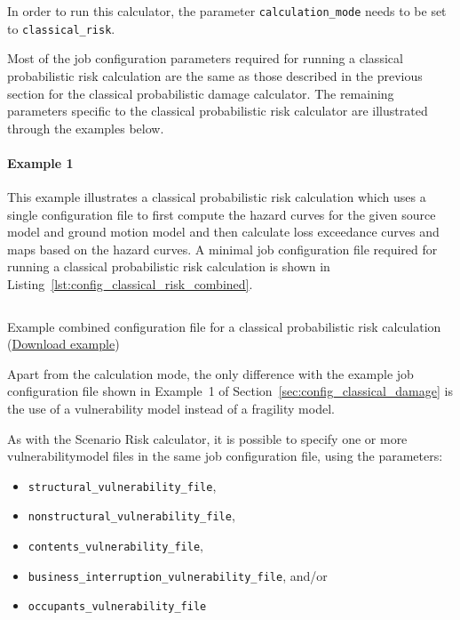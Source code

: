 In order to run this calculator, the parameter \Verb+calculation_mode+ needs
to be set to \Verb+classical_risk+.

Most of the job configuration parameters required for running a classical
probabilistic risk calculation are the same as those described in the previous
section for the classical probabilistic damage calculator. The remaining
parameters specific to the classical probabilistic risk calculator are
illustrated through the examples below.

\paragraph{Example 1}

This example illustrates a classical probabilistic risk calculation which uses
a single configuration file to first compute the hazard curves for the given
source model and ground motion model and then calculate loss exceedance curves
and maps based on the hazard curves. A minimal job configuration file required
for running a classical probabilistic risk calculation is shown in
Listing~\ref{lst:config_classical_risk_combined}.

\begin{listing}[htbp]
  \inputminted[firstline=1,firstnumber=1,fontsize=\footnotesize,frame=single,linenos,bgcolor=lightgray,label=job.ini]{ini}{oqum/risk/verbatim/config_classical_risk_combined.ini}
  \caption{Example combined configuration file for a classical probabilistic risk calculation (\href{https://raw.githubusercontent.com/GEMScienceTools/oq-engine-docs/master/oqum/risk/verbatim/config_classical_risk_combined.xml}{Download example})}
  \label{lst:config_classical_risk_combined}
\end{listing}

Apart from the calculation mode, the only difference with the example job
configuration file shown in Example~1 of
Section~\ref{sec:config_classical_damage} is the use of a vulnerability model
instead of a fragility model.

As with the Scenario Risk calculator, it is possible to specify one or more
\gls{vulnerabilitymodel} files in the same job configuration file, using the
parameters:

\begin{itemize}

  \item \Verb+structural_vulnerability_file+,

  \item \Verb+nonstructural_vulnerability_file+,

  \item \Verb+contents_vulnerability_file+,

  \item \Verb+business_interruption_vulnerability_file+, and/or

  \item \Verb+occupants_vulnerability_file+

\end{itemize}

